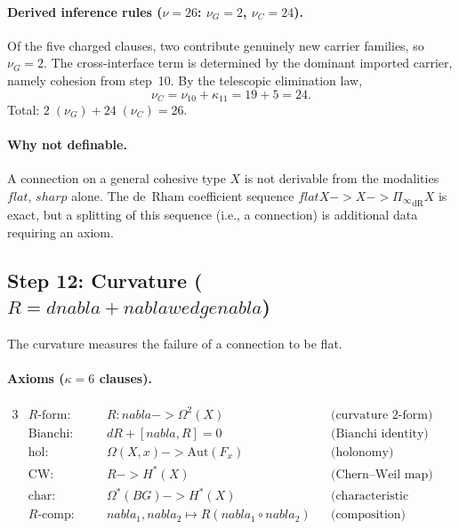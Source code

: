 \documentclass[11pt,a4paper]{article}
\def\to{->}%
\def\nabla{nabla}%
\def\wedge{wedge}%
\def\flat{flat}%
\def\sharp{sharp}%
\theoremstyle{plain}
\theoremstyle{definition}
\theoremstyle{remark}
\begin{document}
\paragraph{Derived inference rules ($\nu = 26$: $\nu_G = 2$, $\nu_C = 24$).}
Of the five charged clauses, two contribute genuinely new carrier families, so $\nu_G = 2$.
The cross-interface term is determined by the dominant imported carrier, namely cohesion from step~10. By the telescopic elimination law,
\[
  \nu_C = \nu_{10} + \kappa_{11} = 19 + 5 = 24.
\]
Total: $2\;(\nu_G) + 24\;(\nu_C) = 26$.

\paragraph{Why not definable.}
A connection on a general cohesive type $X$ is not derivable from the modalities $\flat$, $\sharp$ alone.
The de~Rham coefficient sequence $\flat X \to X \to {\Pi_{\!\infty}}_{\mathrm{dR}} X$ is exact, but a splitting of this sequence (i.e., a connection) is additional data requiring an axiom.

\subsection{\texorpdfstring{Step 12: Curvature ($R = d\nabla + \nabla \wedge \nabla$)}{Step 12: Curvature (R = d nabla + nabla wedge nabla)}}
\label{app:curvature-spec}

The curvature measures the failure of a connection to be flat.

\paragraph{Axioms ($\kappa = 6$ clauses).}
\begin{alignat*}{3}
    &R\text{-form:}             &\quad& R : \nabla \to \Omega^2(X)
        && \text{(curvature 2-form)} \\
    &\mathrm{Bianchi}\text{:}   && dR + [\nabla, R] = 0
        && \text{(Bianchi identity)} \\
    &\mathrm{hol}\text{:}       && \Omega(X, x) \to \mathrm{Aut}(F_x)
        && \text{(holonomy)} \\
    &\mathrm{CW}\text{:}        && R \to H^*(X)
        && \text{(Chern--Weil map)} \\
    &\mathrm{char}\text{:}      && \Omega^*(BG) \to H^*(X)
        && \text{(characteristic classes)} \\
    &R\text{-comp:}             && \nabla_1, \nabla_2 \mapsto R(\nabla_1 \circ \nabla_2)
        && \text{(composition)}
\end{alignat*}
\end{document}
